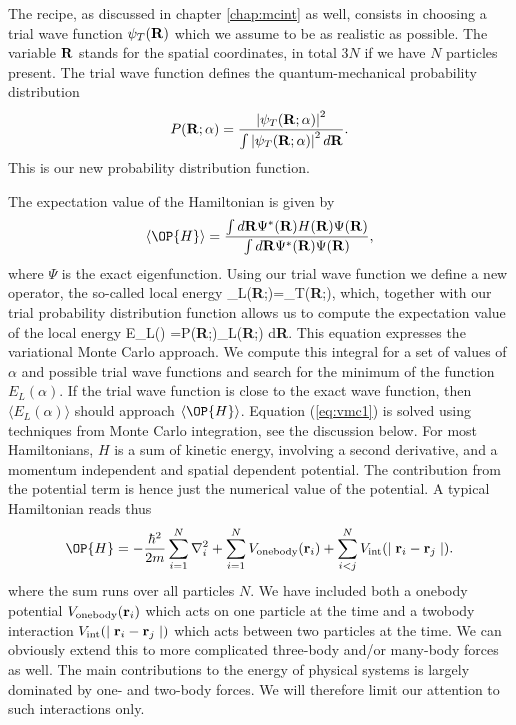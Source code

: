 The recipe, as discussed in chapter \ref{chap:mcint} as well, consists in choosing 
a trial wave function
$\psi_T({\bf R})$ which we assume to be as realistic as possible. 
The variable ${\bf R}$ stands for the spatial coordinates, in total 
$3N$ if we have $N$ particles present. 
The trial wave function defines the quantum-mechanical  probability distribution 
\[
   P({\bf R};\alpha)= \frac{\left|\psi_T({\bf R};\alpha)\right|^2}{\int \left|\psi_T({\bf R};\alpha)\right|^2d{\bf R}}.
\]
This is our new probability distribution function. 

The expectation value of the Hamiltonian
is given by
\[
   \langle \OP{H} \rangle =
   \frac{\int d{\bf R}\Psi^{\ast}({\bf R})H({\bf R})\Psi({\bf R})}
        {\int d{\bf R}\Psi^{\ast}({\bf R})\Psi({\bf R})},
\]
where $\Psi$ is the exact eigenfunction. Using our trial
wave function we define a new operator, 
the so-called local energy
\be
   _L({\bf R};\alpha)=\psi_T({\bf R};\alpha),
   \label{eq:locale1}
\ee
which, together with our trial probability distribution function  
allows us to compute the expectation value of the local energy
\be
  \langle E_L(\alpha) \rangle =\int P({\bf R};\alpha)_L({\bf R};\alpha) d{\bf R}.
  \label{eq:vmc1}
\ee
This equation expresses the variational Monte Carlo approach.
We compute this integral for a set of values of $\alpha$ and possible trial wave functions and search for
the minimum of the function $E_L(\alpha)$. 
If the trial wave function is close to the exact wave function, then $\langle E_L(\alpha) \rangle$ should approach
$\langle \OP{H} \rangle$. Equation (\ref{eq:vmc1}) is solved using techniques from Monte Carlo integration, see the discussion below.
For most Hamiltonians, $H$ is a sum of kinetic energy, involving 
a second derivative, and a momentum independent and spatial dependent potential. 
The contribution from the potential term is hence just the 
numerical value of the potential. A typical Hamiltonian reads thus
\begin{equation}
  \OP{H} = - \frac {\hbar^2}{2m} \sum_{i=1}^N \nabla_i^2 + \sum_{i=1}^N V_{\mathrm{onebody}}({\bf r}_i) 
  + \sum_{i<j}^N V_{\mathrm{int}}(\mid{\bf r}_i -{\bf r}_j \mid ). 
\end{equation}
where the sum runs over all particles $N$. We have included both a onebody potential 
$V_{\mathrm{onebody}}({\bf r}_i)$ which acts on one particle at the time and a twobody
interaction $V_{\mathrm{int}}(\mid{\bf r}_i -{\bf r}_j \mid )$ which acts between two particles
at the time. We can obviously extend this to more complicated three-body and/or many-body forces as well.
The main contributions to the energy of physical systems is largely dominated by one- and two-body
forces. We will therefore limit our attention to such interactions only.

